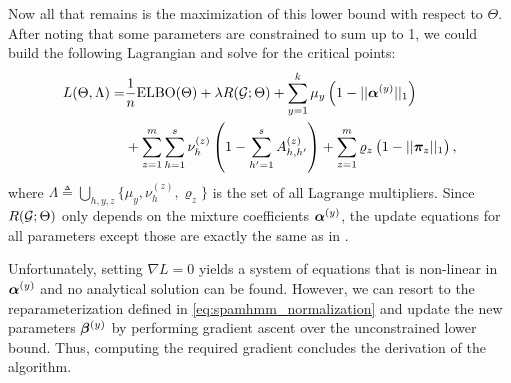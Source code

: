 Now all that remains is the maximization of this lower bound with respect to $\Theta$. After noting that some parameters are constrained to sum up to 1, we could build the following Lagrangian and solve for the critical points:
\begin{align}
	L(\Theta, \Lambda) = & \frac{1}{n} \mathrm{ELBO}(\Theta) + \lambda R({\mathcal{G}}; \Theta) + \sum_{y=1}^k \mu_y\left(1 - ||{\bm{\alpha}}^{(y)}||_{1}\right) \nonumber\\
	&+ \sum_{z=1}^m \sum_{h=1}^s \nu^{(z)}_h \left(1 - \sum_{h'=1}^s {A}^{(z)}_{h,h'}\right)
	+ \sum_{z=1}^m \varrho_z \left(1 - ||{\bm{\pi}}_z||_{1}\right),
\end{align}
where $\Lambda \triangleq \bigcup_{h,y,z} \{\mu_y, \nu^{(z)}_h, \varrho_z\}$ is the set of all Lagrange multipliers. Since $R({\mathcal{G}}; \Theta)$ only depends on the mixture coefficients ${\bm{\alpha}}^{(y)}$, the update equations for all parameters except those are exactly the same as in .

Unfortunately, setting $\nabla L = 0$ yields a system of equations that is non-linear in ${\bm{\alpha}}^{(y)}$ and no analytical solution can be found. However, we can resort to the reparameterization defined in \eqref{eq:spamhmm_normalization} and update the new parameters ${\bm{\beta}}^{(y)}$ by performing gradient ascent over the unconstrained lower bound. Thus, computing the required gradient concludes the derivation of the algorithm.

